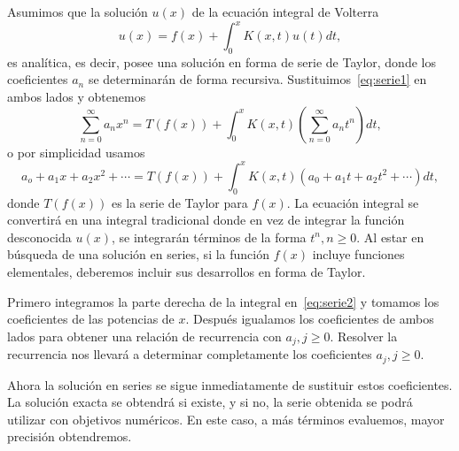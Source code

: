 Asumimos que la solución $u(x)$ de la ecuación integral de Volterra
\begin{equation}
	u(x) = f(x) + \int_0^x K(x,t)u(t)dt,
\end{equation}
es analítica, es decir, posee una solución en forma de serie de Taylor, donde los coeficientes $a_n$ se determinarán de forma recursiva. Sustituimos~\eqref{eq:serie1} en ambos lados y obtenemos
\begin{equation}\label{eq:serie2}
	\sum_{n=0}^{\infty}a_nx^n = T(f(x)) + \int_{0}^{x}K(x,t)(\sum_{n=0}^{\infty}a_nt^n)dt,
\end{equation}
o por simplicidad usamos
\begin{equation}
	a_o + a_1x + a_2x^2 + \cdots = T(f(x)) + \int_{0}^{x}K(x,t) (a_0+a_1t+a_2t^2+\cdots)dt,
\end{equation}
donde $T(f(x))$ es la serie de Taylor para $f(x)$. La ecuación integral se convertirá en una integral tradicional donde en vez de integrar la función desconocida $u(x)$, se integrarán términos de la forma $t^n,n\geqslant0$. Al estar en búsqueda de una solución en series, si la función $f(x)$ incluye funciones elementales, deberemos incluir sus desarrollos en forma de Taylor.

Primero integramos la parte derecha de la integral en~\eqref{eq:serie2} y tomamos los coeficientes de las potencias de $x$. Después igualamos los coeficientes de ambos lados para obtener una relación de recurrencia con $a_j, j\geqslant0$. Resolver la recurrencia nos llevará a determinar completamente los coeficientes $a_j, j\geqslant0$.

Ahora la solución en series se sigue inmediatamente de sustituir estos coeficientes. La solución exacta se obtendrá si existe, y si no, la serie obtenida se podrá utilizar con objetivos numéricos. En este caso, a más términos evaluemos, mayor precisión obtendremos.

